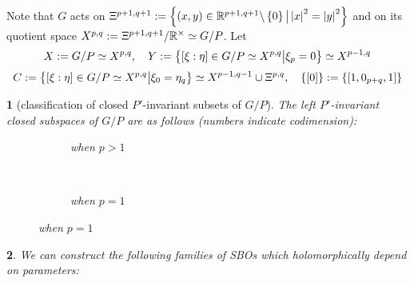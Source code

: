 \documentclass[8pt,notes,notheorems]{beamer}
\renewcommand{\setminus}{\backslash}
\newtheorem{theorem}{\translate{Theorem}}[section]
\newtheorem{theorem}{\translate{Theorem}}
\theoremstyle{definition}
\theoremstyle{example}
\theoremstyle{plain}
\theoremstyle{mystyle}
\begin{document}
\begin{frame}
Note that $G$ acts on $\Xi^{p+1,q+1}:=\mysetn{(x,y)\in\R^{p+1,q+1}\setminus\left\{ 0 \right\}}{\myabs{x}^2=\myabs{y}^2}$ and on its quotient space
$X^{p,q}:=\Xi^{p+1,q+1}/\mathbb{R}^{\times}\simeq G/P$. Let
\[
	X:=G/P\simeq X^{p,q},\quad Y:=\left\{[\xi:\eta]\in G/P\simeq X^{p,q}\big| \xi_{p}=0\right\}\simeq X^{p-1,q}\]
	\[C:=\left\{[\xi:\eta]\in G/P\simeq X^{p,q}\big| \xi_{0}=\eta_q\right\}\simeq X^{p-1,q-1}\cup\Xi^{p,q},\quad\left\{ [0] \right\}:=\left\{ [1,0_{p+q},1] \right\}\]
\begin{theorem}[classification of closed $P'$-invariant subsets of $G/P$]
	The left $P'$-invariant closed subspaces of $G/P$ are as follows (numbers indicate codimension):\\
  \begin{figure}[H]
    \centering
    \begin{subfigure}[t]{0.3\textwidth}
	    \xymatrixrowsep{0.5pc}
	\caption{when $p>1$}
    \end{subfigure}
    ~ %
    \begin{subfigure}[t]{0.3\textwidth}
	    \xymatrixrowsep{0.5pc}
	    {}
	\caption{when $p=1$}
    \end{subfigure}
\end{figure}
\end{theorem}
\end{frame}
\begin{frame}
	\begin{theorem}
		We can construct the following families of SBOs which holomorphically depend on parameters:
	\end{theorem}
\end{frame}
\end{document}
